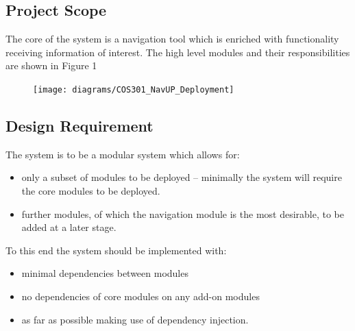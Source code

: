 \documentclass[12pt]{article}
\begin{document}
\subsection{Project Scope}
The core of the system is a navigation tool which is enriched with functionality receiving information of interest. The high level modules and their responsibilities are shown in Figure 1
\begin{figure}
\centering
\texttt{[image: diagrams/COS301\_NavUP\_Deployment]}
\end{figure}
\subsection{Design Requirement}
The system is to be a modular system which allows for:
\begin{itemize}
\item only a subset of modules to be deployed -- minimally the system will require the core modules to be deployed.
\item further modules, of which the navigation module is the most desirable, to be added at a later stage.
\end{itemize}
To this end the system should be implemented with:
\begin{itemize}
\item minimal dependencies between modules
\item no dependencies of core modules on any add-on modules
\item as far as possible making use of dependency injection.  
\end{itemize}
\end{document}
